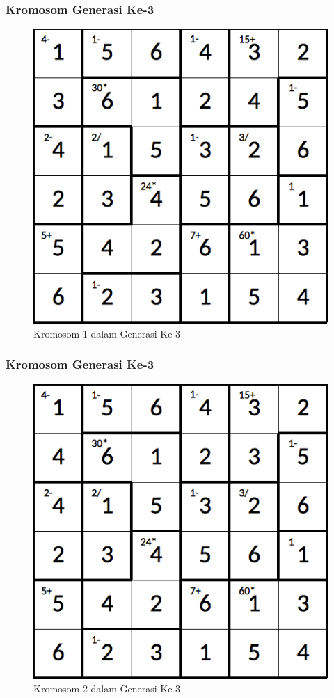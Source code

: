 \documentclass{beamer}
\begin{document}
\begin{frame}
\frametitle{Kromosom Generasi Ke-3}
\begin{figure}
\centering
\captionsetup{justification=centering}
\includegraphics[scale=0.333]{Gambar/hybridgenetic/Generation3Chromosome1}
\caption[Kromosom 1 dalam Generasi Ke-3]{Kromosom 1 dalam Generasi Ke-3}
\label{fig:analisisg3k1}
\end{figure}
\end{frame}

\note{

}

\begin{frame}
\frametitle{Kromosom Generasi Ke-3}
\begin{figure}
\centering
\captionsetup{justification=centering}
\includegraphics[scale=0.333]{Gambar/hybridgenetic/Generation3Chromosome2}
\caption[Kromosom 2 dalam Generasi Ke-3]{Kromosom 2 dalam Generasi Ke-3}
\label{fig:analisisg3k2}
\end{figure}
\end{frame}
\end{document}

